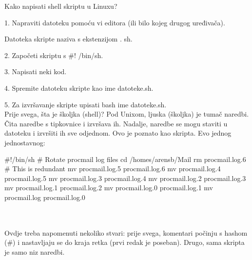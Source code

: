 \documentclass[11pt]{book}
\begin{document}
Kako napisati shell skriptu u Linuxu?

1.	Napraviti datoteku pomoću vi editora (ili bilo kojeg drugog uređivača).

Datoteka skripte naziva s ekstenzijom . sh. 

2.	Započeti skriptu s \#! /bin/sh. 

3.	Napisati neki kod. 

4.	Spremite datoteku skripte kao ime datoteke.sh. 

5.	Za izvršavanje skripte upisati bash ime datoteke.sh.\\



Prije svega, šta je školjka (shell)? Pod Unixom, ljuska (školjka) je tumač naredbi. Čita naredbe s tipkovnice i izvršava ih. Nadalje, naredbe se mogu staviti u datoteku i izvršiti ih sve odjednom. Ovo je poznato kao skripta. Evo jednog jednostavnog:

\begin{shortlisting}
#!/bin/sh
# Rotate procmail log files
cd /homes/arensb/Mail
rm procmail.log.6       # This is redundant
mv procmail.log.5 procmail.log.6
mv procmail.log.4 procmail.log.5
mv procmail.log.3 procmail.log.4
mv procmail.log.2 procmail.log.3
mv procmail.log.1 procmail.log.2
mv procmail.log.0 procmail.log.1
mv procmail.log procmail.log.0
\end{shortlisting}\\\\


Ovdje treba napomenuti nekoliko stvari: prije svega, komentari počinju s hashom (\#) i nastavljaju se do kraja retka (prvi redak je poseban). Drugo, sama skripta je samo niz naredbi.
\end{document}
